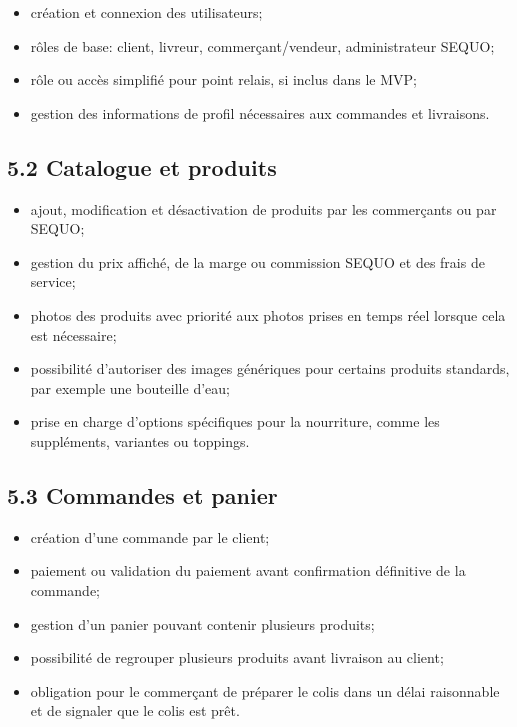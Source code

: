 \documentclass[11pt,a4paper]{article}
\begin{document}
\begin{itemize}
    \item création et connexion des utilisateurs;
    \item rôles de base: client, livreur, commerçant/vendeur, administrateur SEQUO;
    \item rôle ou accès simplifié pour point relais, si inclus dans le MVP;
    \item gestion des informations de profil nécessaires aux commandes et livraisons.
\end{itemize}

\subsection*{5.2 Catalogue et produits}

\begin{itemize}
    \item ajout, modification et désactivation de produits par les commerçants ou par SEQUO;
    \item gestion du prix affiché, de la marge ou commission SEQUO et des frais de service;
    \item photos des produits avec priorité aux photos prises en temps réel lorsque cela est nécessaire;
    \item possibilité d'autoriser des images génériques pour certains produits standards, par exemple une bouteille d'eau;
    \item prise en charge d'options spécifiques pour la nourriture, comme les suppléments, variantes ou toppings.
\end{itemize}

\subsection*{5.3 Commandes et panier}

\begin{itemize}
    \item création d'une commande par le client;
    \item paiement ou validation du paiement avant confirmation définitive de la commande;
    \item gestion d'un panier pouvant contenir plusieurs produits;
    \item possibilité de regrouper plusieurs produits avant livraison au client;
    \item obligation pour le commerçant de préparer le colis dans un délai raisonnable et de signaler que le colis est prêt.
\end{itemize}
\end{document}

